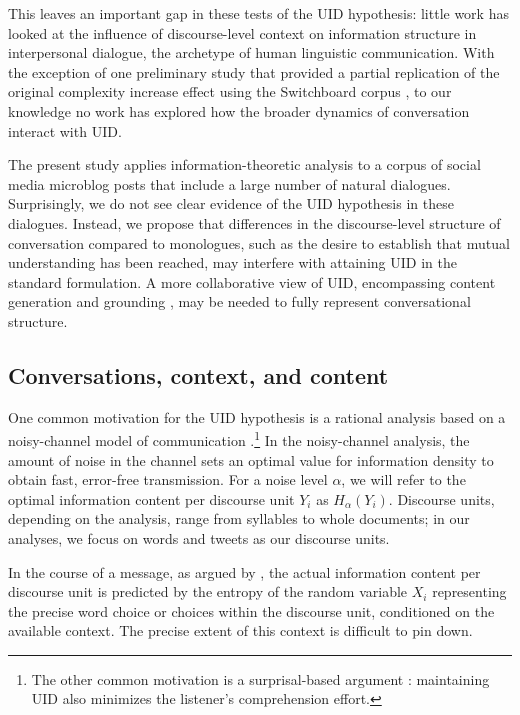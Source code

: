 \documentclass[11pt,letterpaper]{article}
\begin{document}
This leaves an important gap in these tests of the UID hypothesis: little work has looked at the influence of discourse-level context on information structure in interpersonal dialogue, the archetype of human linguistic communication.  With the exception of one preliminary study that provided a partial replication of the original complexity increase effect using the Switchboard corpus \cite{vega2009}, to our knowledge no work has explored how the broader dynamics of conversation interact with UID. 

The present study applies information-theoretic analysis to a corpus of social media microblog posts that include a large number of natural dialogues.  Surprisingly, we do not see clear evidence of the UID hypothesis in these dialogues.  Instead, we propose that differences in the discourse-level structure of conversation compared to monologues, such as the desire to establish that mutual understanding has been reached, may interfere with attaining UID in the standard formulation.  A more collaborative view of UID, encompassing content generation and grounding \cite{clark1987}, may be needed to fully represent conversational structure.

\subsection{Conversations, context, and content}

One common motivation for the UID hypothesis is a rational analysis based on a noisy-channel model of communication \cite{levy2007}.\footnote{The other common motivation is a surprisal-based argument \cite{levy2008}: maintaining UID also minimizes the listener's comprehension effort.}  In the noisy-channel analysis, the amount of noise in the channel sets an optimal value for information density to obtain fast, error-free transmission.  For a noise level $\alpha$, we will refer to the optimal information content per discourse unit $Y_i$ as $H_\alpha(Y_i)$.  Discourse units, depending on the analysis, range from syllables to whole documents; in our analyses, we focus on words and tweets as our discourse units.

In the course of a message, as argued by , the actual information content per discourse unit is predicted by the entropy of the random variable $X_i$ representing the precise word choice or choices within the discourse unit, conditioned on the available context.  The precise extent of this context is difficult to pin down. 
\end{document}
